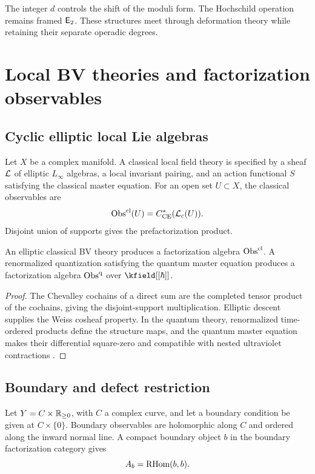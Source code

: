 The integer $d$ controls the shift of the moduli form. The Hochschild operation remains framed $\mathsf E_2$. These structures meet through deformation theory while retaining their separate operadic degrees.

\chapter{Local BV theories and factorization observables}
\section{Cyclic elliptic local Lie algebras}
Let $X$ be a complex manifold. A classical local field theory is specified by a sheaf $\mathcal L$ of elliptic $L_\infty$ algebras, a local invariant pairing, and an action functional $S$ satisfying the classical master equation. For an open set $U\subset X$, the classical observables are
\[
 \operatorname{Obs}^{\mathrm{cl}}(U)=C^*_{\operatorname{CE}}(\mathcal L_c(U)).
\]
Disjoint union of supports gives the prefactorization product.

\begin{theorem}
An elliptic classical BV theory produces a factorization algebra $\operatorname{Obs}^{\mathrm{cl}}$. A renormalized quantization satisfying the quantum master equation produces a factorization algebra $\operatorname{Obs}^{\mathrm{q}}$ over $\kfield[[\hbar]]$.
\end{theorem}
\begin{proof}
The Chevalley cochains of a direct sum are the completed tensor product of the cochains, giving the disjoint-support multiplication. Elliptic descent supplies the Weiss cosheaf property. In the quantum theory, renormalized time-ordered products define the structure maps, and the quantum master equation makes their differential square-zero and compatible with nested ultraviolet contractions \cite{CG1,CG2}.
\end{proof}

\section{Boundary and defect restriction}
Let $Y=C\times\mathbb R_{\ge0}$, with $C$ a complex curve, and let a boundary condition be given at $C\times\{0\}$. Boundary observables are holomorphic along $C$ and ordered along the inward normal line. A compact boundary object $b$ in the boundary factorization category gives
\[
 A_b=\operatorname{RHom}(b,b).
\]

